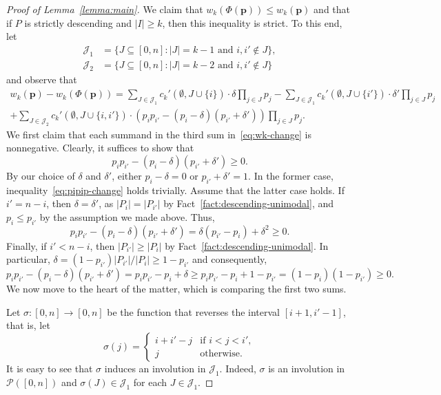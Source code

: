\documentclass[11pt,a4paper,reqno]{amsart}
\numberwithin{claim}{thm}
\theoremstyle{definition}
\newcommand{\bp}{\mathbf{p}}
\newcommand{\cJ}{\mathcal{J}}
\newcommand{\cP}{\mathcal{P}}
\renewcommand{\le}{\leqslant}
\renewcommand{\ge}{\geqslant}
\begin{document}
\begin{proof}[{Proof of Lemma~\ref{lemma:main}}]
  We claim that $w_k(\Phi(\bp)) \le w_k(\bp)$ and that if $P$ is strictly descending and $|I| \ge k$, then this inequality is strict. To this end, let
  \begin{align*}
    \cJ_1 & = \{J \subseteq [0,n] \colon |J| = k-1 \text{ and } i, i' \not\in J\}, \\
    \cJ_2 & = \{J \subseteq [0,n] \colon |J| = k-2 \text{ and } i, i' \not\in J\}
  \end{align*}
  and observe that
  \begin{multline}
    \label{eq:wk-change}
    w_k(\bp) - w_k(\Phi(\bp)) = \sum_{J \in \cJ_1} c_k'(\emptyset, J \cup \{i\}) \cdot \delta \prod_{j \in J} p_j - \sum_{J \in \cJ_1} c_k'(\emptyset, J \cup \{i'\}) \cdot \delta' \prod_{j \in J} p_j \\
    + \sum_{J \in \cJ_2} c_k'(\emptyset, J \cup \{i, i'\}) \cdot (p_ip_{i'} - (p_i-\delta)(p_{i'} + \delta')) \prod_{j \in J} p_j.
  \end{multline}
  We first claim that each summand in the third sum in~\eqref{eq:wk-change} is nonnegative. Clearly, it suffices to show that
  \begin{equation}
    \label{eq:pipip-change}
    p_ip_{i'} - (p_i-\delta)(p_{i'} + \delta') \ge 0.
  \end{equation}
  By our choice of $\delta$ and $\delta'$, either $p_i - \delta = 0$ or $p_{i'} + \delta' = 1$. In the former case, inequality~\eqref{eq:pipip-change} holds trivially. Assume that the latter case holds. If $i' = n-i$, then $\delta = \delta'$, as $|P_i| = |P_{i'}|$ by Fact~\ref{fact:descending-unimodal}, and $p_i \le p_{i'}$ by the assumption we made above. Thus,
  \[
    p_ip_{i'} - (p_i - \delta)(p_{i'} + \delta') = \delta(p_{i'} - p_i) + \delta^2 \ge 0.
  \]
  Finally, if $i' < n-i$, then $|P_{i'}| \ge |P_i|$ by Fact~\ref{fact:descending-unimodal}. In particular, $\delta = (1-p_{i'}) |P_{i'}| / |P_i| \ge 1-p_{i'}$ and consequently,
  \[
    p_ip_{i'} - (p_i - \delta)(p_{i'} + \delta') = p_ip_{i'} - p_i + \delta \ge p_ip_{i'} - p_i + 1 - p_{i'} = (1-p_i)(1-p_{i'}) \ge 0.
  \]
  We now move to the heart of the matter, which is comparing the first two sums.

  Let $\sigma \colon [0,n] \to [0,n]$ be the function that reverses the interval $[i+1,i'-1]$, that is, let
  \[
    \sigma(j) =
    \begin{cases}
      i+i'-j & \text{if $i < j < i'$},\\
      j & \text{otherwise}.
    \end{cases}
  \]
  It is easy to see that $\sigma$ induces an involution in $\cJ_1$. Indeed, $\sigma$ is an involution in $\cP([0,n])$ and $\sigma(J) \in \cJ_1$ for each $J \in \cJ_1$.


\end{proof}
\end{document}
